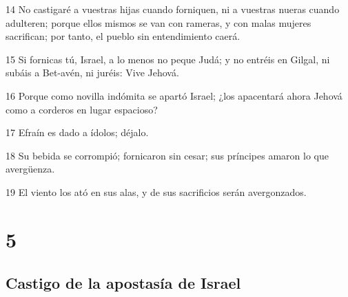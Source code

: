 \par 14 No castigaré a vuestras hijas cuando forniquen, ni a vuestras nueras cuando adulteren; porque ellos mismos se van con rameras, y con malas mujeres sacrifican; por tanto, el pueblo sin entendimiento caerá.
\par 15 Si fornicas tú, Israel, a lo menos no peque Judá; y no entréis en Gilgal, ni subáis a Bet-avén, ni juréis: Vive Jehová.
\par 16 Porque como novilla indómita se apartó Israel; ¿los apacentará ahora Jehová como a corderos en lugar espacioso?
\par 17 Efraín es dado a ídolos; déjalo.
\par 18 Su bebida se corrompió; fornicaron sin cesar; sus príncipes amaron lo que avergüenza.
\par 19 El viento los ató en sus alas, y de sus sacrificios serán avergonzados.

\chapter{5}

\section*{Castigo de la apostasía de Israel}

